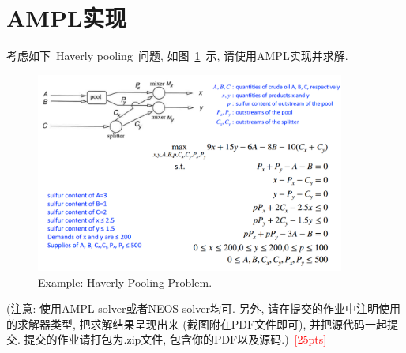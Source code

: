 \documentclass[10pt]{article}
\begin{document}
\section{AMPL实现}
考虑如下~Haverly pooling~问题, 如图~\ref{fig: Haverly}~示, 请使用AMPL实现并求解.
\begin{figure}[htbp]
	\centering
	\includegraphics[width=4in]{Haverly pooling.jpg}
	\caption{Example: Haverly Pooling Problem.}
	\label{fig: Haverly}
\end{figure}

(注意: 使用AMPL solver或者NEOS solver均可. 另外, 请在提交的作业中注明使用的求解器类型, 把求解结果呈现出来 (截图附在PDF文件即可), 并把源代码一起提交. 提交的作业请打包为.zip文件, 包含你的PDF以及源码.)~\textcolor{red}{[25pts]}
\end{document}
